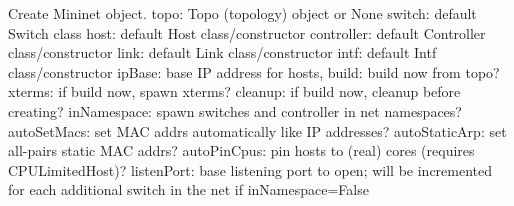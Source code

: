 \begin{DoxyVerb}Create Mininet object.
   topo: Topo (topology) object or None
   switch: default Switch class
   host: default Host class/constructor
   controller: default Controller class/constructor
   link: default Link class/constructor
   intf: default Intf class/constructor
   ipBase: base IP address for hosts,
   build: build now from topo?
   xterms: if build now, spawn xterms?
   cleanup: if build now, cleanup before creating?
   inNamespace: spawn switches and controller in net namespaces?
   autoSetMacs: set MAC addrs automatically like IP addresses?
   autoStaticArp: set all-pairs static MAC addrs?
   autoPinCpus: pin hosts to (real) cores (requires CPULimitedHost)?
   listenPort: base listening port to open; will be incremented for
       each additional switch in the net if inNamespace=False\end{DoxyVerb}
 

